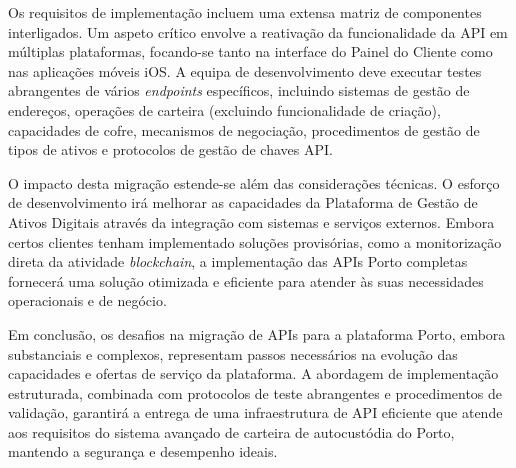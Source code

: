 Os requisitos de implementação incluem uma extensa matriz de componentes interligados. Um aspeto crítico envolve a reativação da funcionalidade da API em múltiplas plataformas, focando-se tanto na interface do Painel do Cliente como nas aplicações móveis iOS. A equipa de desenvolvimento deve executar testes abrangentes de vários \textit{endpoints} específicos, incluindo sistemas de gestão de endereços, operações de carteira (excluindo funcionalidade de criação), capacidades de cofre, mecanismos de negociação, procedimentos de gestão de tipos de ativos e protocolos de gestão de chaves API.

O impacto desta migração estende-se além das considerações técnicas. O esforço de desenvolvimento irá melhorar as capacidades da Plataforma de Gestão de Ativos Digitais através da integração com sistemas e serviços externos. Embora certos clientes tenham implementado soluções provisórias, como a monitorização direta da atividade \textit{blockchain}, a implementação das APIs Porto completas fornecerá uma solução otimizada e eficiente para atender às suas necessidades operacionais e de negócio.

Em conclusão, os desafios na migração de APIs para a plataforma Porto, embora substanciais e complexos, representam passos necessários na evolução das capacidades e ofertas de serviço da plataforma. A abordagem de implementação estruturada, combinada com protocolos de teste abrangentes e procedimentos de validação, garantirá a entrega de uma infraestrutura de API eficiente que atende aos requisitos do sistema avançado de carteira de autocustódia do Porto, mantendo a segurança e desempenho ideais.